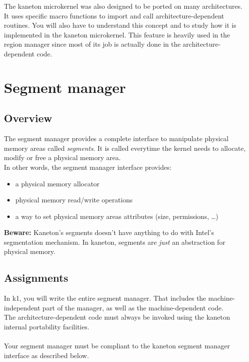 The kaneton microkernel was also designed to be ported on many
architectures. It uses specific macro functions to import and call
architecture-dependent routines. You will also have
to understand this concept and to study how it is implemented in the
kaneton microkernel. This feature is heavily used in the region manager since
most of its job is actually done in the architecture-dependent code.

%
%

\newpage

\section{Segment manager}

\subsection*{Overview}
The segment manager provides a complete interface to manipulate physical
memory areas called {\em segments}. It is called everytime the kernel
needs to allocate, modify or free a physical memory area.\\

In other words, the segment manager interface provides:
\begin{itemize}
\item a physical memory allocator
\item physical memory read/write operations
\item a way to set physical memory areas attributes (size, permissions, \ldots)
\end{itemize}

\textbf{Beware:} Kaneton's segments doesn't have anything to do with Intel's segmentation mechanism.
In kaneton, segments are \textit{just} an abstraction for physical memory.

\subsection*{Assignments}
In k1, you will write the entire segment manager. That includes the
machine-independent part of the manager, as well as the machine-dependent
code.\\

The architecture-dependent code must always be invoked using the kaneton
internal portability facilities.\\
\\
Your segment manager must be compliant to the kaneton segment manager
interface as described below.\\

